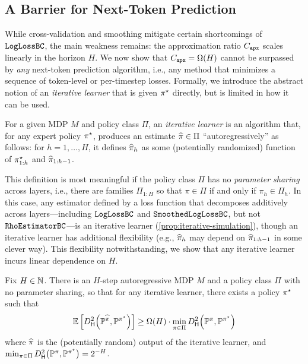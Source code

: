 \subsection{A Barrier for Next-Token Prediction}
\label{sec:limits}

While cross-validation and smoothing mitigate certain shortcomings of $\texttt{LogLossBC}$, the main weakness remains: the approximation ratio $C_{\texttt{apx}}$ scales linearly in the horizon $H$. We now show that $C_{\texttt{apx}} = \Omega(H)$
cannot be surpassed by \emph{any} next-token prediction algorithm, i.e., any method that minimizes a sequence of token-level or per-timestep losses.
  Formally, we introduce the abstract notion of an \emph{iterative learner} that is given $\pi^{\star}$ directly, but is limited in how it can be used.
\begin{definition}\label{def:iterative}
  For a given MDP $M$ and policy class $\Pi$, an \emph{iterative learner} is an algorithm that, for any expert policy $\pi^{\star}$, produces an estimate $\widehat{\pi} \in \Pi$ ``autoregressively'' as follows: for $h = 1,\dots,H$, it defines $\widehat{\pi}_h$ as some (potentially randomized) function of $\pi^{\star}_{1:h}$ and $\widehat{\pi}_{1:h-1}$.%
\end{definition}
%

This definition is most meaningful if the policy class $\Pi$ has no \emph{parameter sharing} across layers, i.e., there are families $\Pi_{1:H}$ so that $\pi\in\Pi$ if and only if $\pi_h \in \Pi_h$. In this case, any estimator defined by a loss function that decomposes additively across layers---including $\texttt{LogLossBC}$ and $\texttt{SmoothedLogLossBC}$, but not $\texttt{RhoEstimatorBC}$---is an iterative learner (\cref{prop:iterative-simulation}), though an iterative learner has additional flexibility (e.g., $\widehat{\pi}_h$ may depend on $\widehat{\pi}_{1:h-1}$ in some clever way). This flexibility
notwithstanding, we show that any iterative learner incurs linear dependence on $H$.

\begin{theorem}%
  \label{thm:ntp-lb}
  Fix $H \in \mathbb{N}$. There is an $H$-step autoregressive MDP $M$ and a policy class
  $\Pi$ with no parameter sharing, so that for any iterative learner, there exists a policy $\pi^{\star}$ such that\loose
  {
%
\begin{equation} \EE\left[\Dhels{\BP^{\pihat}}{\BP^{\pistar}}\right] \geq \Omega(H) \cdot \min_{\pi \in \Pi} \Dhels{\BP^{\pi}}{\BP^{\pistar}}\label{eq:ntp-lb}\end{equation}
}where $\widehat{\pi}$ is the (potentially random) output of the iterative learner, and $\min_{\pi \in \Pi} \Dhels{\BP^{\pi}}{\BP^{\pistar}} = 2^{-H}$. %
\end{theorem}

